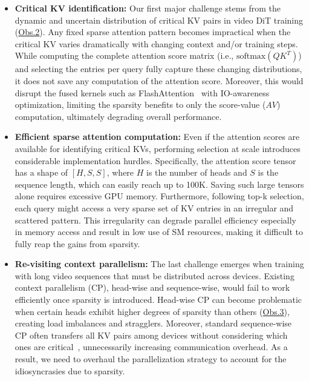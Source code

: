 \begin{itemize}[leftmargin=*]
\item \textbf{Critical KV identification:} Our first major challenge stems from the dynamic and uncertain distribution of critical KV pairs in video DiT training (\hyperlink{obs2}{Obs.2}). Any fixed sparse attention pattern becomes impractical when the critical KV varies dramatically with changing context and/or training steps. 
While computing the complete attention score matrix (i.e., $\text{softmax}(QK^{T})$) and selecting the \topk entries per query fully capture these changing distributions, it does not save any computation of the attention score.
Moreover, this would disrupt the fused kernels such as FlashAttention~\cite{dao2022flashattention1,dao2023flashattention2} with IO-awareness optimization, limiting the sparsity benefits to only the score-value ($AV$) computation, ultimately degrading overall performance.

\item \textbf{Efficient sparse attention computation:} Even if the attention scores are available for identifying critical KVs, performing \topk selection at scale introduces considerable implementation hurdles. Specifically, the attention score tensor has a shape of $[H, S, S]$, where $H$ is the number of heads and $S$ is the sequence length, which can easily reach up to 100K.
Saving such large tensors alone requires excessive GPU memory.
Furthermore, following top-k selection, each query might access a very sparse set of KV entries in an irregular and scattered pattern. This irregularity can degrade parallel efficiency especially in memory access and result in low use of SM resources, making it difficult to fully reap the gains from sparsity.


\item \textbf{Re-visiting context parallelism:} 
The last challenge emerges when training with long video sequences that must be distributed across devices. 
Existing context parallelism (CP), head-wise and sequence-wise, would fail to work efficiently once sparsity is introduced. 
Head-wise CP can become problematic when certain heads exhibit higher degrees of sparsity than others (\hyperlink{obs3}{Obs.3}), creating load imbalances and stragglers. 
Moreover, standard sequence-wise CP often transfers all KV pairs among devices without considering which ones are critical~\cite{liu2023ring}, unnecessarily increasing communication overhead. As a result, we need to overhaul the parallelization strategy to account for the idiosyncrasies due to sparsity.

\end{itemize}

